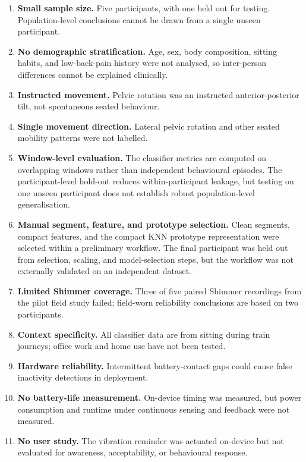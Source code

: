 \begin{enumerate}
    \item \textbf{Small sample size.} Five participants, with one held out for testing. Population-level conclusions cannot be drawn from a single unseen participant.
    \item \textbf{No demographic stratification.} Age, sex, body composition, sitting habits, and low-back-pain history were not analysed, so inter-person differences cannot be explained clinically.
    \item \textbf{Instructed movement.} Pelvic rotation was an instructed anterior-posterior tilt, not spontaneous seated behaviour.
    \item \textbf{Single movement direction.} Lateral pelvic rotation and other seated mobility patterns were not labelled.
    \item \textbf{Window-level evaluation.} The classifier metrics are computed on overlapping windows rather than independent behavioural episodes. The participant-level hold-out reduces within-participant leakage, but testing on one unseen participant does not establish robust population-level generalisation.
    \item \textbf{Manual segment, feature, and prototype selection.} Clean segments, compact features, and the compact KNN prototype representation were selected within a preliminary workflow. The final participant was held out from selection, scaling, and model-selection steps, but the workflow was not externally validated on an independent dataset.
    \item \textbf{Limited Shimmer coverage.} Three of five paired Shimmer recordings from the pilot field study failed; field-worn reliability conclusions are based on two participants.
    \item \textbf{Context specificity.} All classifier data are from sitting during train journeys; office work and home use have not been tested.
    \item \textbf{Hardware reliability.} Intermittent battery-contact gaps could cause false inactivity detections in deployment.
    \item \textbf{No battery-life measurement.} On-device timing was measured, but power consumption and runtime under continuous sensing and feedback were not measured.
    \item \textbf{No user study.} The vibration reminder was actuated on-device but not evaluated for awareness, acceptability, or behavioural response.
\end{enumerate}

